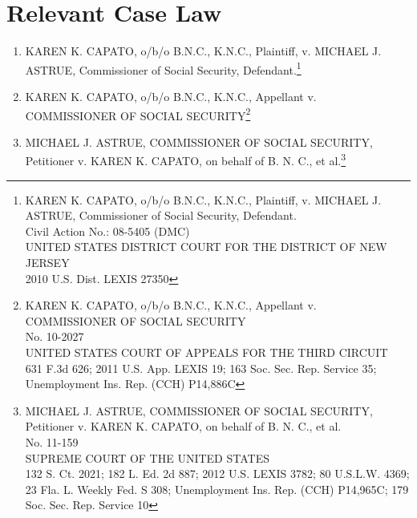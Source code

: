 \documentclass[letterpaper,10pt,twoside]{article}
\begin{document}
\section*{Relevant Case Law}
\begin{enumerate}
\item KAREN K. CAPATO, o/b/o B.N.C., K.N.C., Plaintiff, v. MICHAEL J. ASTRUE, Commissioner of Social Security, Defendant.\footnote{\label{Original Case}KAREN K. CAPATO, o/b/o B.N.C., K.N.C., Plaintiff, v. MICHAEL J. ASTRUE, Commissioner of Social Security, Defendant.\\
Civil Action No.: 08-5405 (DMC)\\
UNITED STATES DISTRICT COURT FOR THE DISTRICT OF NEW JERSEY\\
2010 U.S. Dist. LEXIS 27350}
\item KAREN K. CAPATO, o/b/o B.N.C., K.N.C., Appellant v. COMMISSIONER OF SOCIAL SECURITY\footnote{\label{Appealed}KAREN K. CAPATO, o/b/o B.N.C., K.N.C., Appellant v. COMMISSIONER OF SOCIAL SECURITY\\
No. 10-2027\\
UNITED STATES COURT OF APPEALS FOR THE THIRD CIRCUIT\\
631 F.3d 626; 2011 U.S. App. LEXIS 19; 163 Soc. Sec. Rep. Service 35; Unemployment Ins. Rep. (CCH) P14,886C}
\item MICHAEL J. ASTRUE, COMMISSIONER OF SOCIAL SECURITY, Petitioner v. KAREN K. CAPATO, on behalf of B. N. C., et al.\footnote{\label{US Supreme Court Ruling}MICHAEL J. ASTRUE, COMMISSIONER OF SOCIAL SECURITY, Petitioner v. KAREN K. CAPATO, on behalf of B. N. C., et al.\\
No. 11-159\\
SUPREME COURT OF THE UNITED STATES\\
132 S. Ct. 2021; 182 L. Ed. 2d 887; 2012 U.S. LEXIS 3782; 80 U.S.L.W. 4369; 23 Fla. L. Weekly Fed. S 308; Unemployment Ins. Rep. (CCH) P14,965C; 179 Soc. Sec. Rep. Service 10}
\end{enumerate}
\end{document}
